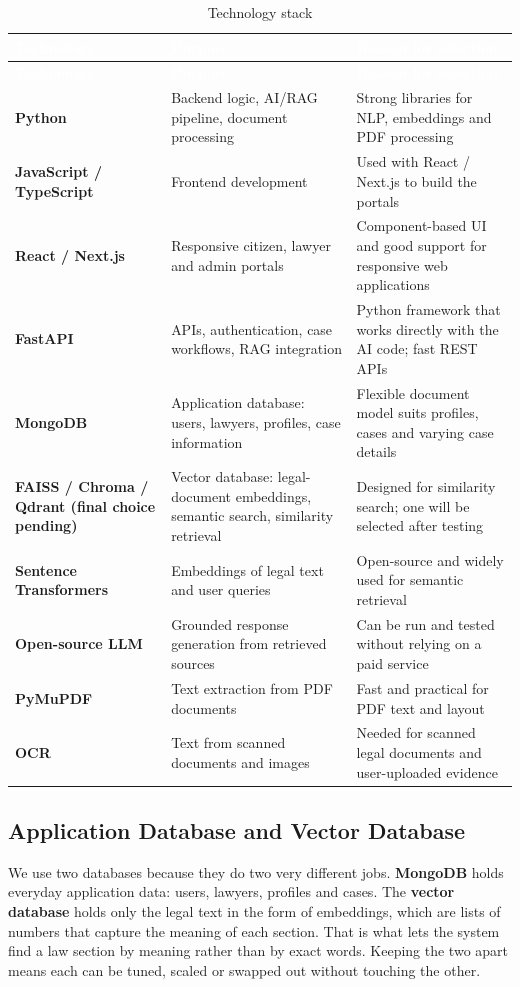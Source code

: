\documentclass[12pt,a4paper]{report}
\newcommand{\thd}[1]{\textcolor{white}{\textbf{#1}}}
\newcommand{\headrow}{\rowcolor{tablehead}}
\begin{document}
\begin{longtable}{|L{3.6cm}|L{5.0cm}|L{5.4cm}|}
\caption{Technology stack}\label{tab:tech}\\
\hline
\headrow \thd{Technology} & \thd{Purpose} & \thd{Reason for selection} \\ \hline
\endfirsthead
\hline
\headrow \thd{Technology} & \thd{Purpose} & \thd{Reason for selection} \\ \hline
\endhead
\textbf{Python} & Backend logic, AI/RAG pipeline, document processing & Strong libraries for NLP, embeddings and PDF processing \\ \hline
{}\textbf{JavaScript / TypeScript} & Frontend development & Used with React / Next.js to build the portals \\ \hline
\textbf{React / Next.js} & Responsive citizen, lawyer and admin portals & Component-based UI and good support for responsive web applications \\ \hline
{}\textbf{FastAPI} & APIs, authentication, case workflows, RAG integration & Python framework that works directly with the AI code; fast REST APIs \\ \hline
\textbf{MongoDB} & Application database: users, lawyers, profiles, case information & Flexible document model suits profiles, cases and varying case details \\ \hline
{}\textbf{FAISS / Chroma / Qdrant (final choice pending)} & Vector database: legal-document embeddings, semantic search, similarity retrieval & Designed for similarity search; one will be selected after testing \\ \hline
\textbf{Sentence Transformers} & Embeddings of legal text and user queries & Open-source and widely used for semantic retrieval \\ \hline
{}\textbf{Open-source LLM} & Grounded response generation from retrieved sources & Can be run and tested without relying on a paid service \\ \hline
\textbf{PyMuPDF} & Text extraction from PDF documents & Fast and practical for PDF text and layout \\ \hline
{}\textbf{OCR} & Text from scanned documents and images & Needed for scanned legal documents and user-uploaded evidence \\ \hline
\end{longtable}

\subsection*{Application Database and Vector Database}
We use two databases because they do two very different jobs. \textbf{MongoDB} holds everyday application data: users, lawyers, profiles and cases. The \textbf{vector database} holds only the legal text in the form of embeddings, which are lists of numbers that capture the meaning of each section. That is what lets the system find a law section by meaning rather than by exact words. Keeping the two apart means each can be tuned, scaled or swapped out without touching the other.
\end{document}

